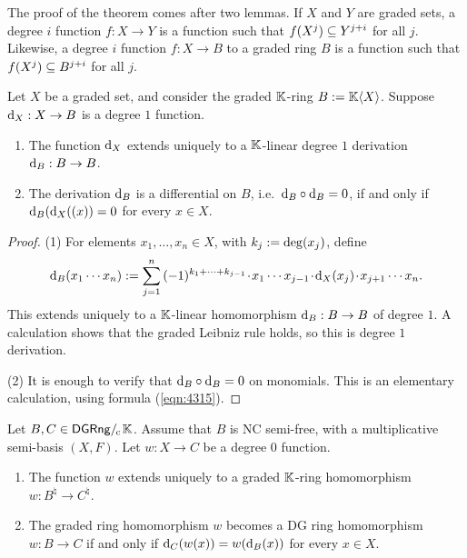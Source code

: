 The proof of the theorem comes after two lemmas. 
If $X$ and $Y$ are graded sets, a degree $i$ function $f : X \to Y$ is a 
function such that $f(X^j) \subseteq Y^{j + i}$ for all $j$. Likewise,
a degree $i$ function $f : X \to B$ to a graded ring $B$ is a function 
such that $f(X^j) \subseteq B^{j + i}$ for all $j$.

\begin{lem} \label{lem:4315}
Let $X$ be a graded set, and consider the graded $\mathbb{K}$-ring 
$B := \mathbb{K} \langle X \rangle$. Suppose $\mathrm{d}_X : X \to B$ is a degree $1$ function.
\begin{enumerate}
\item  The function $\mathrm{d}_X$ extends uniquely to a $\mathbb{K}$-linear degree $1$ 
derivation $\mathrm{d}_B : B \to B$. 

\item The derivation $\mathrm{d}_B$ is a differential on $B$, i.e.\ 
$\mathrm{d}_B \circ \mathrm{d}_B = 0$, if and only if $\mathrm{d}_B(\mathrm{d}_X((x)) = 0$ for every 
$x \in X$. 
\end{enumerate}
\end{lem}

\begin{proof} \mbox{}

\smallskip \noindent
(1) For elements $x_1, \ldots, x_n \in X$, with 
$k_j := \operatorname{deg}(x_j)$, define 
\begin{equation} \label{eqn:4315}
\mathrm{d}_B(x_1 \cdots x_n) := \sum_{j = 1}^n \, 
(-1)^{k_1 + \cdots + k_{j - 1}} \mspace{1.5mu}{\cdot}\mspace{1.5mu} x_1 \cdots x_{j - 1} \mspace{1.5mu}{\cdot}\mspace{1.5mu} 
\mathrm{d}_X(x_j) \mspace{1.5mu}{\cdot}\mspace{1.5mu} x_{j + 1} \cdots x_{n} . 
\end{equation}
This extends uniquely to a $\mathbb{K}$-linear homomorphism $\mathrm{d}_B : B \to B$ of degree 
$1$. A calculation shows that the graded Leibniz rule holds, so this is  
degree $1$ derivation. 

\medskip \noindent
(2) It is enough to verify that $\mathrm{d}_B \circ \mathrm{d}_B = 0$ on monomials. 
This is an elementary calculation, using formula (\ref{eqn:4315}). 
\end{proof}

\begin{lem} \label{lem:4316}
Let $B, C \in \mathrm{\mathsf{DGRng}} /_{\mspace{-2mu} \mathrm{c}} \mspace{2mu} \mathbb{K}$. Assume that $B$ is NC semi-free, with 
a multiplicative semi-basis $(X, F)$.  
Let $w : X \to C$ be a degree $0$ function. 
\begin{enumerate}
\item  The function $w$ extends uniquely to a graded $\mathbb{K}$-ring homomorphism 
$w : B^{\natural} \to C^{\natural}$. 

\item The graded ring homomorphism $w$ becomes a DG ring homomorphism 
$w : B \to C$ if and only if 
$\mathrm{d}_C(w(x)) = w(\mathrm{d}_B(x))$ for every $x \in X$. 
\end{enumerate}
\end{lem}


